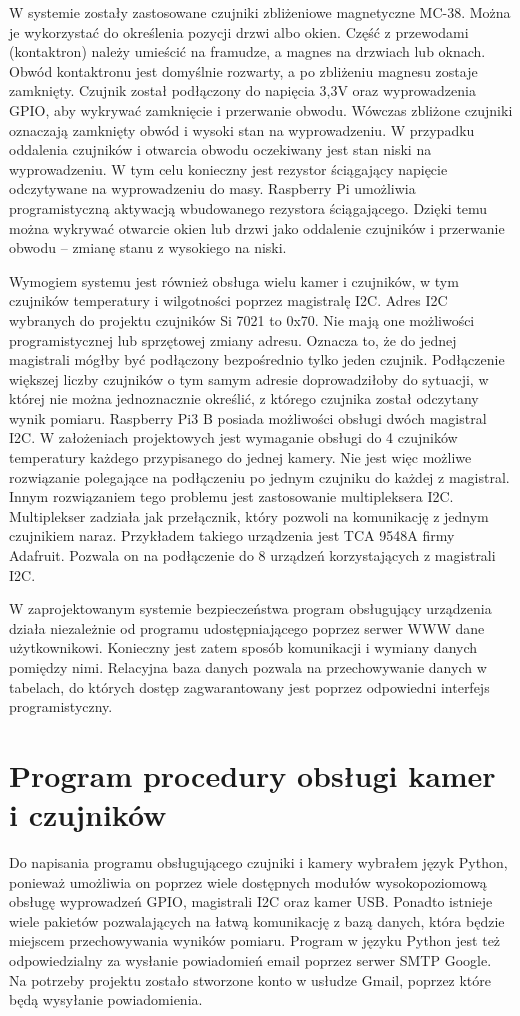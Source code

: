 \documentclass[a4paper,12pt,twoside]{article}
\begin{document}
W systemie zostały zastosowane czujniki zbliżeniowe magnetyczne MC-38. Można je wykorzystać do określenia pozycji drzwi albo okien. Część z przewodami (kontaktron) należy umieścić na framudze, a magnes na drzwiach lub oknach. Obwód kontaktronu jest domyślnie rozwarty, a po zbliżeniu magnesu zostaje zamknięty. Czujnik został podłączony do napięcia 3,3V oraz wyprowadzenia GPIO, aby wykrywać zamknięcie i przerwanie obwodu. Wówczas zbliżone czujniki oznaczają zamknięty obwód i wysoki stan na wyprowadzeniu. W przypadku oddalenia czujników i otwarcia obwodu oczekiwany jest stan niski na wyprowadzeniu. W tym celu konieczny jest rezystor ściągający napięcie odczytywane na wyprowadzeniu do masy. Raspberry Pi umożliwia programistyczną aktywacją wbudowanego rezystora ściągającego. Dzięki temu można wykrywać otwarcie okien lub drzwi jako oddalenie czujników i przerwanie obwodu -- zmianę stanu z wysokiego na niski.

Wymogiem systemu jest również obsługa wielu kamer i czujników, w tym czujników temperatury i wilgotności poprzez magistralę I2C. Adres I2C wybranych do projektu czujników Si 7021 to 0x70. Nie mają one możliwości programistycznej lub sprzętowej zmiany adresu. Oznacza to, że do jednej magistrali mógłby być podłączony bezpośrednio tylko jeden czujnik. Podłączenie większej liczby czujników o tym samym adresie doprowadziłoby do sytuacji, w której nie można jednoznacznie określić, z którego czujnika został odczytany wynik pomiaru. Raspberry Pi3 B posiada możliwości obsługi dwóch magistral I2C. W założeniach projektowych jest wymaganie obsługi do 4 czujników temperatury każdego przypisanego do jednej kamery. Nie jest więc możliwe rozwiązanie polegające na podłączeniu po jednym czujniku do każdej z magistral. Innym rozwiązaniem tego problemu jest zastosowanie multipleksera I2C. Multiplekser zadziała jak przełącznik, który pozwoli na komunikację z jednym czujnikiem naraz. Przykładem takiego urządzenia jest TCA 9548A firmy Adafruit. Pozwala on na podłączenie do 8 urządzeń korzystających z magistrali I2C.

W zaprojektowanym systemie bezpieczeństwa program obsługujący urządzenia działa niezależnie od programu udostępniającego poprzez serwer WWW dane użytkownikowi. Konieczny jest zatem sposób komunikacji i wymiany danych pomiędzy nimi. Relacyjna baza danych pozwala na przechowywanie danych w tabelach, do których dostęp zagwarantowany jest poprzez odpowiedni interfejs programistyczny. 

\newpage
\section{Program procedury obsługi kamer i czujników}
Do napisania programu obsługującego czujniki i kamery wybrałem język Python, ponieważ umożliwia on poprzez wiele dostępnych modułów wysokopoziomową obsługę wyprowadzeń GPIO, magistrali I2C oraz kamer USB. Ponadto istnieje wiele pakietów pozwalających na łatwą komunikację z bazą danych, która będzie miejscem przechowywania wyników pomiaru. Program w języku Python jest też odpowiedzialny za wysłanie powiadomień email poprzez serwer SMTP Google. Na potrzeby projektu zostało stworzone konto w usłudze Gmail, poprzez które będą wysyłanie powiadomienia. 
\end{document}
